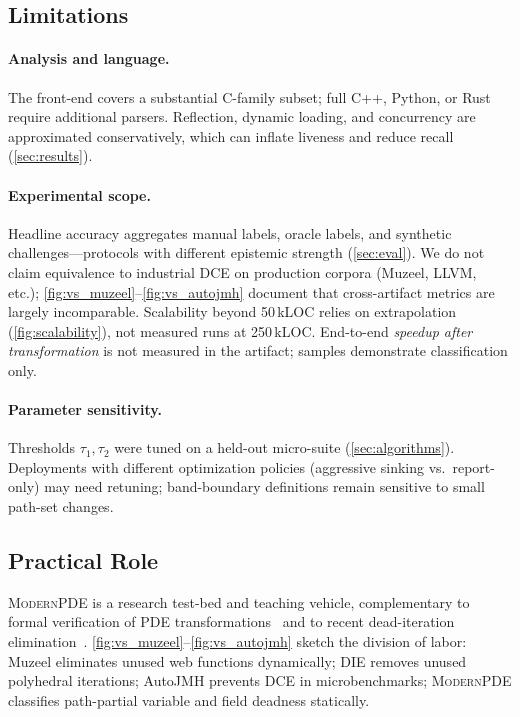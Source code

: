 \documentclass[acmsmall,screen,review,anonymous]{acmart}
\begin{document}
\subsection{Limitations}
\paragraph{Analysis and language.}
The front-end covers a substantial C-family subset; full C++, Python, or Rust require additional parsers. Reflection, dynamic loading, and concurrency are approximated conservatively, which can inflate liveness and reduce recall (\autoref{sec:results}).

\paragraph{Experimental scope.}
Headline accuracy aggregates manual labels, oracle labels, and synthetic challenges---protocols with different epistemic strength (\autoref{sec:eval}). We do not claim equivalence to industrial DCE on production corpora (Muzeel, LLVM, etc.); \autoref{fig:vs_muzeel}--\autoref{fig:vs_autojmh} document that cross-artifact metrics are largely incomparable. Scalability beyond 50\,kLOC relies on extrapolation (\autoref{fig:scalability}), not measured runs at 250\,kLOC. End-to-end \emph{speedup after transformation} is not measured in the artifact; samples demonstrate classification only.

\paragraph{Parameter sensitivity.}
Thresholds $\tau_1,\tau_2$ were tuned on a held-out micro-suite (\autoref{sec:algorithms}). Deployments with different optimization policies (aggressive sinking vs.\ report-only) may need retuning; band-boundary definitions remain sensitive to small path-set changes.

\subsection{Practical Role}
\textsc{ModernPDE} is a research test-bed and teaching vehicle, complementary to formal verification of PDE transformations~\cite{rinard2026nexis} and to recent dead-iteration elimination~\cite{bastoul2025dead}. \autoref{fig:vs_muzeel}--\autoref{fig:vs_autojmh} sketch the division of labor: Muzeel eliminates unused web functions dynamically; DIE removes unused polyhedral iterations; AutoJMH prevents DCE in microbenchmarks; \textsc{ModernPDE} classifies path-partial variable and field deadness statically.
\end{document}
